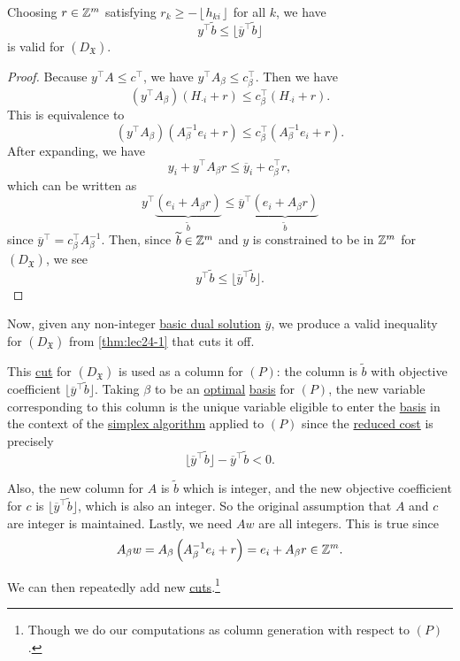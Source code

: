 \begin{theorem}\label{thm:lec24-2}
	Choosing \(r\in\mathbb{\MakeUppercase{z}} ^m\) satisfying \(r_k \geq - \left\lfloor h_{ki} \right\rfloor\) for all \(k\), we have
	\[
		y^{\top} \widetilde{b} \leq \lfloor \overline{y} ^{\top} \widetilde{b} \rfloor
	\]
	is valid for \((D_{\mathfrak{X}})\).
\end{theorem}
\begin{proof}
	Because \(y^{\top}A\leq c^{\top}\), we have \(y^{\top}A_{\beta}\leq c_{\beta}^{\top}\). Then we have
	\[
		\left(y^{\top}A_{\beta}\right)\left(H_{\cdot i}+r\right) \leq c_{\beta}^{\top}\left(H_{\cdot i}+r\right).
	\]
	This is equivalence to
	\[
		\left(y^{\top}A_{\beta}\right)\left(A^{-1}_{\beta}e_{i}+r\right) \leq c_{\beta}^{\top}\left(A^{-1}_{\beta}e_{i}+r\right).
	\]
	After expanding, we have
	\[
		y_{i}+y^{\top}A_{\beta}r\leq \overline{y}_{i}+c_{\beta}^{\top}r,
	\]
	which can be written as
	\[
		y^{\top}\underbrace{\left(e_{i}+A_{\beta}r\right)}_{\widetilde{b} } \leq \overline{y}^{\top} \underbrace{\left(e_{i}+A_{\beta}r\right)}_{\widetilde{b}}
	\]
	since \(\overline{y}^{\top} = c_{\beta}^{\top}A^{-1}_{\beta}\). Then, since \(\widetilde{b} \in \mathbb{\MakeUppercase{z}} ^m\) and \(y\) is constrained to be
	in \(\mathbb{\MakeUppercase{z}} ^m\) for \((D_{\mathfrak{X}})\), we see
	\[
		y^{\top}\widetilde{b}\leq \lfloor \overline{y}^{\top}\widetilde{b} \rfloor.
	\]
\end{proof}

Now, given any non-integer \hyperref[def:dual-basic-solution]{basic dual solution} \(\overline{y}\), we produce a valid inequality for \((D_{\mathfrak{X}})\)
from \autoref{thm:lec24-1} that cuts it off.
\begin{note}
	This \hyperref[def:Chvatal-Gomory-cut]{cut} for \((D_{\mathfrak{X}})\) is used as a column for \((P)\): the column is \(\widetilde{b} \) with objective coefficient \(\lfloor \overline{y} ^{\top} \widetilde{b} \rfloor\).
	Taking \(\beta\) to be an \hyperref[def:optimal-solution]{optimal} \hyperref[def:basic]{basis} for \((P)\), the new variable corresponding to this column is the unique
	variable eligible to enter the \hyperref[def:basic]{basis} in the context of the \hyperref[algo:simplex-algorithm]{simplex algorithm} applied to \((P)\) since the
	\hyperref[def:reduced-cost]{reduced cost} is precisely
	\[
		\lfloor \overline{y} ^{\top} \widetilde{b} \rfloor-\overline{y} ^{\top} \widetilde{b} < 0.
	\]

	Also, the new column for \(A\) is \(\widetilde{b} \) which is integer, and the new objective coefficient for \(c\) is
	\(\lfloor \overline{y} ^{\top} \widetilde{b} \rfloor\), which is also an integer. So the original assumption that \(A\)
	and \(c\) are integer is maintained. Lastly, we need \(Aw\) are all integers. This is true since
	\[
		A_{\beta}w = A_{\beta}\left(A^{-1}_{\beta}e_{i}+r\right) = e_{i}+A_{\beta}r \in \mathbb{\MakeUppercase{Z}}^m.
	\]

	We can then repeatedly add new \hyperref[def:Chvatal-Gomory-cut]{cuts}.\footnote{Though we do our computations as column generation with respect to \((P)\).}
\end{note}


